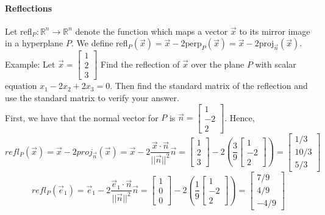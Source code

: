 \documentclass[10pt,letter]{article}
\begin{document}
\paragraph{Reflections} Let refl$_P:\mathbb{R}^n\rightarrow\mathbb{R}^n$ denote the function which maps a vector $\vec{x}$ to its mirror image in a hyperplane $P$. We define refl$_P(\vec{x})=\vec{x}-2\text{perp}_P(\vec{x})=\vec{x}-2\text{proj}_{\vec{n}}(\vec{x})$. \\ 
Example: Let $\vec{x}=\begin{bmatrix}1\\2\\3\end{bmatrix}$ Find the reflection of $\vec{x}$ over the plane $P$ with scalar equation $x_1-2x_2+2x_3=0$. Then find the standard matrix of the reflection and use the standard matrix to verify your answer. \\ 
First, we have that the normal vector for $P$ is $\vec{n}=\begin{bmatrix}1\\-2\\2\end{bmatrix}$. Hence, 
$$refl_P(\vec{x})=\vec{x}-2proj_{\vec{n}}(\vec{x})=\vec{x}-2\frac{\vec{x}\cdot\vec{n}}{||\vec{n}||^2}\vec{n}=\begin{bmatrix}1\\2\\3\end{bmatrix}-2\left(\frac{3}{9}\begin{bmatrix}1\\-2\\2\end{bmatrix}\right)=\begin{bmatrix}1/3\\10/3\\5/3\end{bmatrix}$$ 
$$refl_P(\vec{e}_1)=\vec{e}_1-2\frac{\vec{e}_1\cdot\vec{n}}{||\vec{n}||^2}\vec{n}=\begin{bmatrix}1\\0\\0\end{bmatrix}-2\left(\frac{1}{9}\begin{bmatrix}1\\-2\\2\end{bmatrix}\right)=\begin{bmatrix}7/9\\4/9\\-4/9\end{bmatrix}$$
\end{document}
